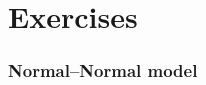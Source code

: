 \documentclass[12pt]{article}
\begin{document}
\newpage
\section{Exercises}

\subsubsection*{Normal--Normal model}

\end{document}

